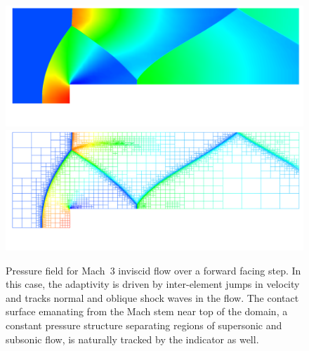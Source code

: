 \documentclass[global,twocolumn,final]{svjour}
\begin{document}
\begin{figure}[hbt]
  \begin{center}
    \includegraphics[width=\columnwidth]{figures/wt_m3_p} \\
    \includegraphics[width=\columnwidth]{figures/wt_m3_p_mesh}
    \caption{Pressure field for Mach~3 inviscid flow over a forward
    facing step.  In this case, the adaptivity is driven by
    inter-element jumps in velocity and tracks normal and oblique
    shock waves in the flow.  The contact surface emanating from the
    Mach stem near top of the domain, a constant pressure structure
    separating regions of supersonic and subsonic flow, is naturally
    tracked by the indicator as well.
    \label{fig:wt_m3}}
  \end{center}
\end{figure}
\end{document}
